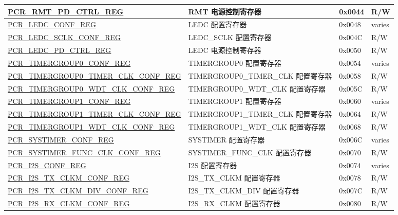 \begin{longtable}{ | p{7.2cm} | p{6cm} | p{1.3cm} | p{1cm} | }
\hyperref[regdesc:PCRRMTPDCTRLREG]{PCR\_RMT\_PD\_CTRL\_REG} & RMT 电源控制寄存器 & 0x0044 & R/W \\ \hline
\hyperref[regdesc:PCRLEDCCONFREG]{PCR\_LEDC\_CONF\_REG} & LEDC 配置寄存器 & 0x0048 & varies \\ \hline
\hyperref[regdesc:PCRLEDCSCLKCONFREG]{PCR\_LEDC\_SCLK\_CONF\_REG} & LEDC\_SCLK 配置寄存器 & 0x004C & R/W \\ \hline
\hyperref[regdesc:PCRLEDCPDCTRLREG]{PCR\_LEDC\_PD\_CTRL\_REG} & LEDC 电源控制寄存器 & 0x0050 & R/W \\ \hline
\hyperref[regdesc:PCRTIMERGROUP0CONFREG]{PCR\_TIMERGROUP0\_CONF\_REG} & TIMERGROUP0 配置寄存器 & 0x0054 & varies \\ \hline
\hyperref[regdesc:PCRTIMERGROUP0TIMERCLKCONFREG]{PCR\_TIMERGROUP0\_TIMER\_CLK\_CONF\_REG} & TIMERGROUP0\_TIMER\_CLK 配置寄存器 & 0x0058 & R/W \\ \hline
\hyperref[regdesc:PCRTIMERGROUP0WDTCLKCONFREG]{PCR\_TIMERGROUP0\_WDT\_CLK\_CONF\_REG} & TIMERGROUP0\_WDT\_CLK 配置寄存器 & 0x005C & R/W \\ \hline
\hyperref[regdesc:PCRTIMERGROUP1CONFREG]{PCR\_TIMERGROUP1\_CONF\_REG} & TIMERGROUP1 配置寄存器 & 0x0060 & varies \\ \hline
\hyperref[regdesc:PCRTIMERGROUP1TIMERCLKCONFREG]{PCR\_TIMERGROUP1\_TIMER\_CLK\_CONF\_REG} & TIMERGROUP1\_TIMER\_CLK 配置寄存器 & 0x0064 & R/W \\ \hline
\hyperref[regdesc:PCRTIMERGROUP1WDTCLKCONFREG]{PCR\_TIMERGROUP1\_WDT\_CLK\_CONF\_REG} & TIMERGROUP1\_WDT\_CLK 配置寄存器 & 0x0068 & R/W \\ \hline
\hyperref[regdesc:PCRSYSTIMERCONFREG]{PCR\_SYSTIMER\_CONF\_REG} & SYSTIMER 配置寄存器 & 0x006C & varies \\ \hline
\hyperref[regdesc:PCRSYSTIMERFUNCCLKCONFREG]{PCR\_SYSTIMER\_FUNC\_CLK\_CONF\_REG} & SYSTIMER\_FUNC\_CLK 配置寄存器 & 0x0070 & R/W \\ \hline
\hyperref[regdesc:PCRI2SCONFREG]{PCR\_I2S\_CONF\_REG} & I2S 配置寄存器 & 0x0074 & varies \\ \hline
\hyperref[regdesc:PCRI2STXCLKMCONFREG]{PCR\_I2S\_TX\_CLKM\_CONF\_REG} & I2S\_TX\_CLKM 配置寄存器 & 0x0078 & R/W \\ \hline
\hyperref[regdesc:PCRI2STXCLKMDIVCONFREG]{PCR\_I2S\_TX\_CLKM\_DIV\_CONF\_REG} & I2S\_TX\_CLKM\_DIV 配置寄存器 & 0x007C & R/W \\ \hline
\hyperref[regdesc:PCRI2SRXCLKMCONFREG]{PCR\_I2S\_RX\_CLKM\_CONF\_REG} & I2S\_RX\_CLKM 配置寄存器 & 0x0080 & R/W \\ \hline

\end{longtable}
